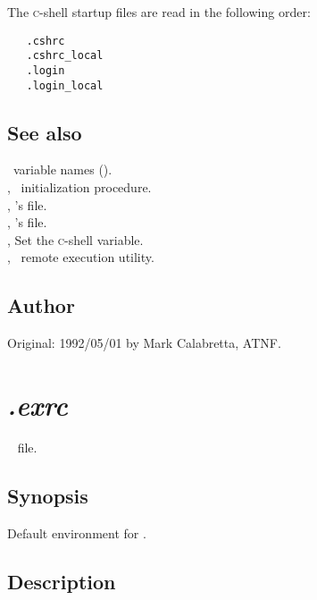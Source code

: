 The \textsc{c}-shell startup files are read in the following order:

\begin{verbatim}
   .cshrc
   .cshrc_local
   .login
   .login_local
\end{verbatim}

\subsection*{See also}

\aipspp\ variable names ().\\
, \aipspp\ initialization procedure.\\
, 's  file.\\
, 's  file.\\
, Set the \textsc{c}-shell  variable.\\
, \aipspp\ remote execution utility.

\subsection*{Author}

Original: 1992/05/01 by Mark Calabretta, ATNF.


\newpage
\section{\textit{.exrc}}
\label{.exrc}

\aipspp\  file.

\subsection*{Synopsis}

\begin{synopsis}
   Default environment for .
\end{synopsis}

\subsection*{Description}

